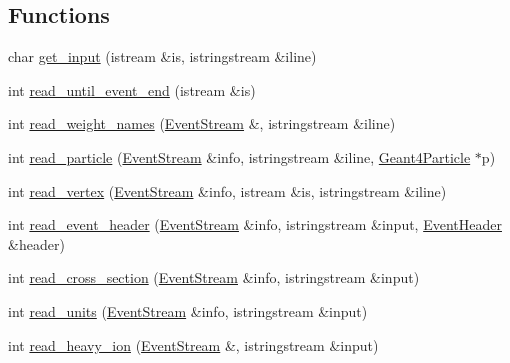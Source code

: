 \subsection*{Functions}
\begin{DoxyCompactItemize}
\item 
char \hyperlink{namespace_d_d4hep_1_1_simulation_1_1_hep_m_c_ae12e8ca37b7071f67c1810fa9420acad}{get\+\_\+input} (istream \&is, istringstream \&iline)
\item 
int \hyperlink{namespace_d_d4hep_1_1_simulation_1_1_hep_m_c_a433e938fb3dfef8ae2590fa16cdb2229}{read\+\_\+until\+\_\+event\+\_\+end} (istream \&is)
\item 
int \hyperlink{namespace_d_d4hep_1_1_simulation_1_1_hep_m_c_a9a0a541fc8f48d5f9b80131b7f3b7e88}{read\+\_\+weight\+\_\+names} (\hyperlink{class_d_d4hep_1_1_simulation_1_1_hep_m_c_1_1_event_stream}{Event\+Stream} \&, istringstream \&iline)
\item 
int \hyperlink{namespace_d_d4hep_1_1_simulation_1_1_hep_m_c_ab38b9307ace39b3227306e907c3f6840}{read\+\_\+particle} (\hyperlink{class_d_d4hep_1_1_simulation_1_1_hep_m_c_1_1_event_stream}{Event\+Stream} \&info, istringstream \&iline, \hyperlink{class_d_d4hep_1_1_simulation_1_1_geant4_particle}{Geant4\+Particle} $\ast$p)
\item 
int \hyperlink{namespace_d_d4hep_1_1_simulation_1_1_hep_m_c_a05115a3e0b60dbe2ee86c5094cdd16bc}{read\+\_\+vertex} (\hyperlink{class_d_d4hep_1_1_simulation_1_1_hep_m_c_1_1_event_stream}{Event\+Stream} \&info, istream \&is, istringstream \&iline)
\item 
int \hyperlink{namespace_d_d4hep_1_1_simulation_1_1_hep_m_c_aff50680cc4089a0f2c3b7a0218b3ed2e}{read\+\_\+event\+\_\+header} (\hyperlink{class_d_d4hep_1_1_simulation_1_1_hep_m_c_1_1_event_stream}{Event\+Stream} \&info, istringstream \&input, \hyperlink{class_d_d4hep_1_1_simulation_1_1_hep_m_c_1_1_event_header}{Event\+Header} \&header)
\item 
int \hyperlink{namespace_d_d4hep_1_1_simulation_1_1_hep_m_c_a873025dee0b6f8a5ce8bd3485e518213}{read\+\_\+cross\+\_\+section} (\hyperlink{class_d_d4hep_1_1_simulation_1_1_hep_m_c_1_1_event_stream}{Event\+Stream} \&info, istringstream \&input)
\item 
int \hyperlink{namespace_d_d4hep_1_1_simulation_1_1_hep_m_c_a35bd1c93d31d755bf0b911399c90c789}{read\+\_\+units} (\hyperlink{class_d_d4hep_1_1_simulation_1_1_hep_m_c_1_1_event_stream}{Event\+Stream} \&info, istringstream \&input)
\item 
int \hyperlink{namespace_d_d4hep_1_1_simulation_1_1_hep_m_c_a973a0fe661658598d3982e072e11f77d}{read\+\_\+heavy\+\_\+ion} (\hyperlink{class_d_d4hep_1_1_simulation_1_1_hep_m_c_1_1_event_stream}{Event\+Stream} \&, istringstream \&input)

\end{DoxyCompactItemize}
